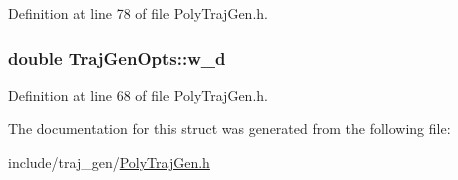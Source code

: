 Definition at line 78 of file Poly\+Traj\+Gen.\+h.

\subsubsection[{\texorpdfstring{w\+\_\+d}{w_d}}]{\setlength{\rightskip}{0pt plus 5cm}double Traj\+Gen\+Opts\+::w\+\_\+d}\hypertarget{struct_traj_gen_opts_a7424679070ea7264f7c8b6df5461bdb9}{}\label{struct_traj_gen_opts_a7424679070ea7264f7c8b6df5461bdb9}


Definition at line 68 of file Poly\+Traj\+Gen.\+h.



The documentation for this struct was generated from the following file\+:\begin{DoxyCompactItemize}
\item 
include/traj\+\_\+gen/\hyperlink{_poly_traj_gen_8h}{Poly\+Traj\+Gen.\+h}\end{DoxyCompactItemize}

